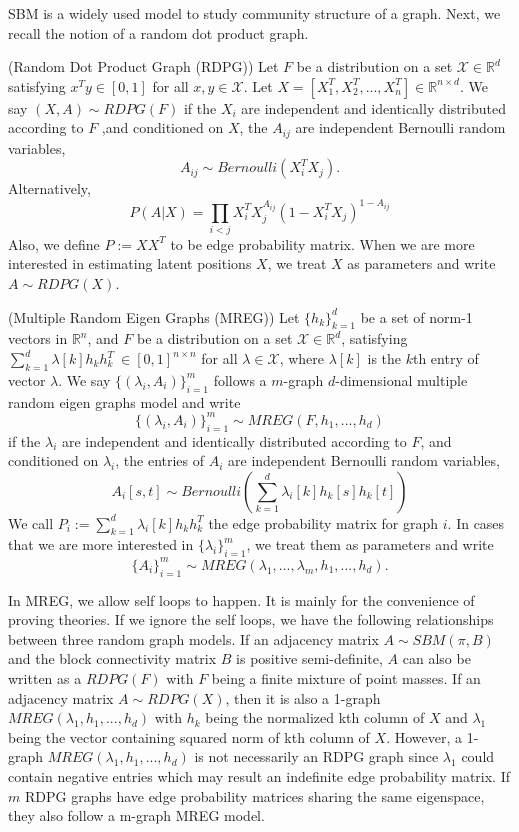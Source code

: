 \documentclass[10pt,journal,compsoc]{IEEEtran}
\newenvironment{definition}[1][Definition]{\begin{trivlist}
		\item[\hskip \labelsep {\bfseries #1}]}{\end{trivlist}}
\begin{document}
\noindent SBM is a widely used model to study community structure of a graph\cite{karrer2011stochastic}. Next, we recall the notion of a random dot product graph\cite{young2007random}. 

\begin{definition} (Random Dot Product Graph (RDPG)) Let $F$ be a distribution on a set $\mathcal{X} \in \mathbb{R}^d$ satisfying $x^T y \in [0, 1]$ for all $x, y \in \mathcal{X}$. Let $X=[X_1^T,X_2^T,...,X_n^T] \in \mathbb{R}^{n \times d}$. We say $(X,A) \sim RDPG(F)$ if the $X_i$ are independent and identically distributed according to $F$ ,and conditioned on $X$, the $A_{ij}$ are independent Bernoulli random variables,
\[ A_{ij} \sim Bernoulli(X_i^T X_j). \]
Alternatively,
\[ P(A|X) = \prod_{i<j} X_i^T X_j ^{ A_{ij}} (1-X_i^T X_j)^{1- A_{ij}}\]
Also, we define $P:=XX^T$ to be edge probability matrix. When we are more interested in estimating latent positions $X$, we treat $X$ as parameters and write $A \sim RDPG(X)$.
\end{definition}

\begin{definition} (Multiple Random Eigen Graphs (MREG)) Let $\{h_k\}_{k=1}^{d}$ be a set of norm-1 vectors in $\mathbb{R}^{n}$, and  $F$ be a distribution on a set $\mathcal{X} \in \mathbb{R}^d$,  satisfying $\sum\limits_{k=1}^{d} \lambda [k] h_k  h_k^T \  \in [0, 1]^{n \times n} $ for all $\lambda \in \mathcal{X}$, where $\lambda[k]$ is the $k$th entry of vector $\lambda$. We say $\{(\lambda_i,A_i)\}_{i=1}^{m}$ follows a $m$-graph $d$-dimensional multiple random eigen graphs model and write
\[\{(\lambda_i,A_i)\}_{i=1}^{m} \sim MREG(F,h_1,...,h_d)\]
if the $\lambda_i$ are independent and identically distributed according to $F$, and conditioned on $\lambda_i$, the entries of $A_i$ are independent Bernoulli random variables,
\[ A_{i}[s,t] \sim Bernoulli( \sum_{k=1}^{d} \lambda_{i}[k] h_{k} [s] h_{k} [t] ) \]
We call $P_i:=\sum_{k=1}^{d} \lambda_i [k] h_k  h_k^T$ the edge probability matrix for graph $i$. In cases that we are more interested in $\{\lambda_i\}_{i=1}^m$, we treat them as parameters and write 
\[\{A_i\}_{i=1}^{m} \sim MREG(\lambda_1,...,\lambda_m,h_1,...,h_d).\] 
\end{definition}


\noindent In MREG, we allow self loops to happen. It is mainly for the convenience of proving theories. If we ignore the self loops, we have the following relationships between three random graph models. If an adjacency matrix $A \sim SBM(\pi,B)$ and the block connectivity matrix $B$ is positive semi-definite, $A$ can also be written as a $RDPG(F)$ with $F$ being a finite mixture of point masses. If an adjacency matrix $A \sim RDPG(X)$, then it is also a 1-graph $MREG(\lambda_1,h_1,...,h_d)$ with $h_k$ being the normalized kth column of $X$ and $\lambda_1$ being the vector containing squared norm of kth column of $X$. However, a 1-graph $MREG(\lambda_1,h_1,...,h_d)$ is not necessarily an RDPG graph since $\lambda_1$ could contain negative entries which may result an indefinite edge probability matrix. If $m$ RDPG graphs have edge probability matrices sharing the same eigenspace, they also follow a m-graph MREG model. 
\end{document}
